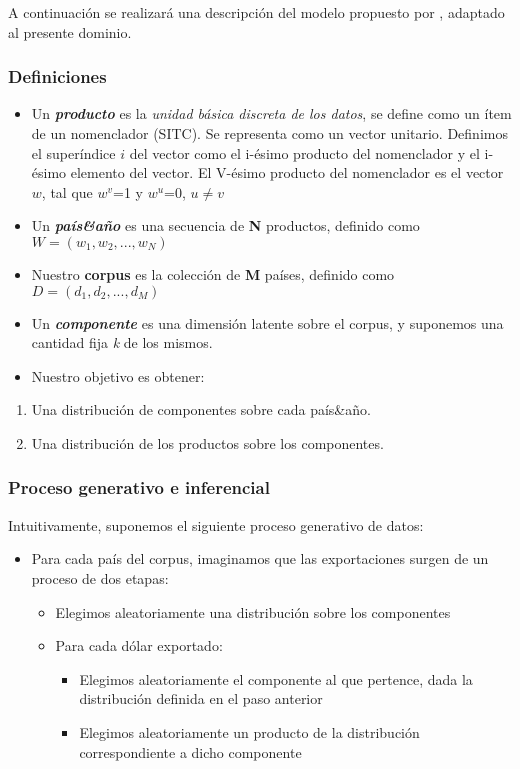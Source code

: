 \documentclass[class=article, crop=false]{standalone}
\begin{document}
A continuación se realizará una descripción del modelo propuesto por \cite{blei2003latent}, adaptado al presente dominio. 
	
\subsubsection{Definiciones}

\begin{itemize}
\item
Un \textbf{\emph{producto}} es la \emph{unidad básica discreta de los
	datos}, se define como un ítem de un nomenclador (SITC). Se representa
como un vector unitario. Definimos el superíndice \(i\) del vector
como el i-ésimo producto del nomenclador y el i-ésimo elemento del
vector. El V-ésimo producto del nomenclador es el vector \(w\), tal
que \(w^v\)=1 y \(w^u\)=0, \(u\neq v\)
\item
Un \textbf{\emph{país\&año}} es una secuencia de \textbf{N} productos,
definido como \(W= (w_1, w_2, ..., w_N)\)
\item
Nuestro \textbf{corpus} es la colección de \textbf{M} países, definido
como \(D = (d_1, d_2,..., d_M)\)
\item
Un \textbf{\emph{componente}} es una dimensión latente sobre el
corpus, y suponemos una cantidad fija \emph{k} de los mismos.
\item
Nuestro objetivo es obtener:
\end{itemize}

\begin{enumerate}
\def\labelenumi{\arabic{enumi}.}
\item
Una distribución de componentes sobre cada país\&año.
\item
Una distribución de los productos sobre los componentes.
\end{enumerate}


\subsubsection{Proceso generativo e inferencial}

Intuitivamente, suponemos el siguiente proceso generativo de datos:

\begin{itemize}
\item
Para cada país del corpus, imaginamos que las exportaciones surgen de
un proceso de dos etapas:

\begin{itemize}
	\item
	Elegimos aleatoriamente una distribución sobre los componentes
	\item
	Para cada dólar exportado:
	
	\begin{itemize}
		\item
		Elegimos aleatoriamente el componente al que pertence, dada la
		distribución definida en el paso anterior
		\item
		Elegimos aleatoriamente un producto de la distribución
		correspondiente a dicho componente
	\end{itemize}
\end{itemize}
\end{itemize}
\end{document}
